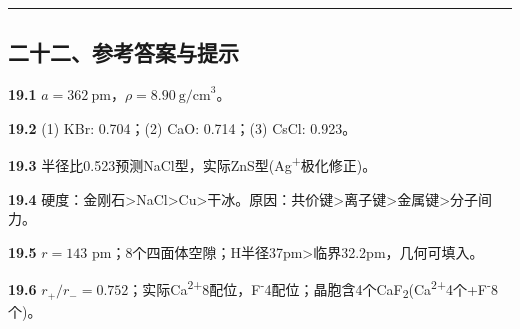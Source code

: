 \documentclass[a4paper,11pt]{ctexart}
\newcommand{\箭}{\ensuremath{\rightarrow}}
\newcommand{\左箭}{\ensuremath{\leftarrow}}
\newcommand{\上箭}{\ensuremath{\uparrow}}
\newcommand{\下箭}{\ensuremath{\downarrow}}
\newcommand{\衡}{\ensuremath{\rightleftharpoons}}
\newcommand{\双箭}{\ensuremath{\leftrightarrow}}
\newcommand{\约等于}{\ensuremath{\approx}}
\newcommand{\小于等于}{\ensuremath{\leq}}
\newcommand{\大于等于}{\ensuremath{\geq}}
\newcommand{\不等于}{\ensuremath{\neq}}
\newcommand{\西格马}{\ensuremath{\sigma}}
\newcommand{\派}{\ensuremath{\pi}}
\begin{document}
\begin{center}\rule{0.5\linewidth}{0.5pt}\end{center}

\subsection{二十二、参考答案与提示}\label{ux4e8cux5341ux4e8cux53c2ux8003ux7b54ux6848ux4e0eux63d0ux793a}

\textbf{19.1} \(a = 362\ \mathrm{pm}\)，\(\rho = 8.90\ \mathrm{g/cm}^3\)。

\textbf{19.2} (1) KBr: 0.704；(2) CaO: 0.714；(3) CsCl: 0.923。

\textbf{19.3} 半径比0.523预测NaCl型，实际ZnS型(Ag\textsuperscript{+}极化修正)。

\textbf{19.4} 硬度：金刚石\textgreater NaCl\textgreater Cu\textgreater 干冰。原因：共价键\textgreater 离子键\textgreater 金属键\textgreater 分子间力。

\textbf{19.5} \(r=143\) pm；8个四面体空隙；H半径37pm\textgreater 临界32.2pm，几何可填入。

\textbf{19.6} \(r_+/r_-=0.752\)；实际Ca\textsuperscript{2+}8配位，F\textsuperscript{-}4配位；晶胞含4个CaF\textsubscript{2}(Ca\textsuperscript{2+}4个+F\textsuperscript{-}8个)。
\end{document}
